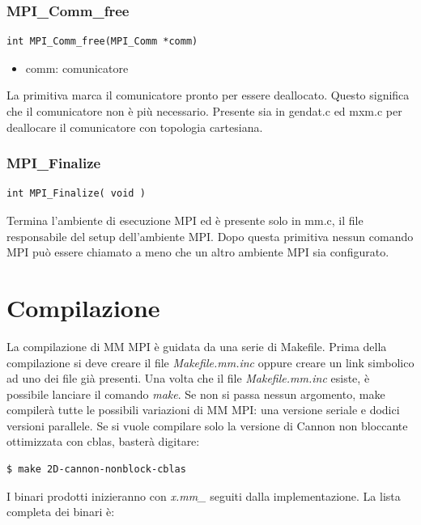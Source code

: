 \subsubsection{MPI\_Comm\_free}
\begin{lstlisting}
int MPI_Comm_free(MPI_Comm *comm)
\end{lstlisting}
\begin{itemize}
  \item comm: comunicatore
\end{itemize}

La primitiva marca il comunicatore pronto per essere deallocato. Questo significa che il comunicatore non \`{e} pi\`{u} necessario. Presente sia in gendat.c ed mxm.c per deallocare il comunicatore con topologia cartesiana.

\subsubsection{MPI\_Finalize}
\begin{lstlisting}
int MPI_Finalize( void )
\end{lstlisting}

Termina l'ambiente di esecuzione MPI ed \`{e} presente solo in mm.c, il file responsabile del setup dell'ambiente MPI. Dopo questa primitiva nessun comando MPI pu\`{o} essere chiamato a meno che un altro ambiente MPI sia configurato.

\section{Compilazione}

La compilazione di MM MPI \`{e} guidata da una serie di Makefile. Prima della compilazione si deve creare il file \textit{Makefile.mm.inc} oppure creare un link simbolico ad uno dei file gi\`{a} presenti.
Una volta che il file \textit{Makefile.mm.inc} esiste, \`{e} possibile lanciare il comando \textit{make}. Se non si passa nessun argomento, make compiler\`{a} tutte le possibili variazioni di MM MPI: una versione seriale e dodici versioni parallele.
Se si vuole compilare solo la versione di Cannon non bloccante ottimizzata con cblas, baster\`{a} digitare:

\begin{lstlisting}
$ make 2D-cannon-nonblock-cblas
\end{lstlisting}

I binari prodotti inizieranno con \textit{x.mm\_} seguiti dalla implementazione. La lista completa dei binari \`{e}:

